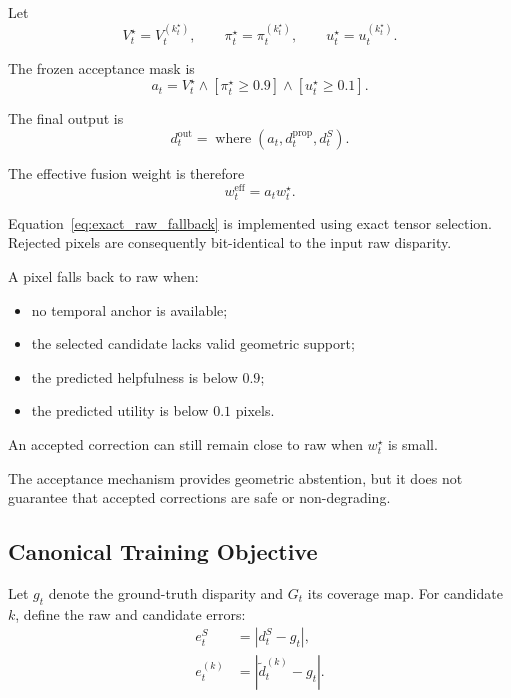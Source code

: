 \documentclass[11pt,a4paper]{article}
\begin{document}
Let
%
\begin{equation}
V_t^\star
=
V_t^{(k_t^\star)},
\qquad
\pi_t^\star
=
\pi_t^{(k_t^\star)},
\qquad
u_t^\star
=
u_t^{(k_t^\star)}.
\end{equation}

The frozen acceptance mask is
%
\begin{equation}
a_t
=
V_t^\star
\land
\left[
\pi_t^\star\geq0.9
\right]
\land
\left[
u_t^\star\geq0.1
\right].
\label{eq:acceptance_mask}
\end{equation}

The final output is
%
\begin{equation}
d_t^{\mathrm{out}}
=
\operatorname{where}
\left(
a_t,
d_t^{\mathrm{prop}},
d_t^S
\right).
\label{eq:exact_raw_fallback}
\end{equation}

The effective fusion weight is therefore
%
\begin{equation}
w_t^{\mathrm{eff}}
=
a_t w_t^\star.
\label{eq:effective_weight}
\end{equation}

Equation~\eqref{eq:exact_raw_fallback} is implemented using exact tensor
selection. Rejected pixels are consequently bit-identical to the input
raw disparity.

A pixel falls back to raw when:

\begin{itemize}
    \item no temporal anchor is available;
    \item the selected candidate lacks valid geometric support;
    \item the predicted helpfulness is below \(0.9\);
    \item the predicted utility is below \(0.1\) pixels.
\end{itemize}

An accepted correction can still remain close to raw when
\(w_t^\star\) is small.

The acceptance mechanism provides geometric abstention, but it does not
guarantee that accepted corrections are safe or non-degrading.

\subsection{Canonical Training Objective}
\label{sec:training_objective}

Let \(g_t\) denote the ground-truth disparity and \(G_t\) its coverage
map. For candidate \(k\), define the raw and candidate errors:
%
\begin{align}
e_t^S
&=
\left|
d_t^S-g_t
\right|,
\\
e_t^{(k)}
&=
\left|
\widetilde d_t^{(k)}-g_t
\right|.
\end{align}
\end{document}

